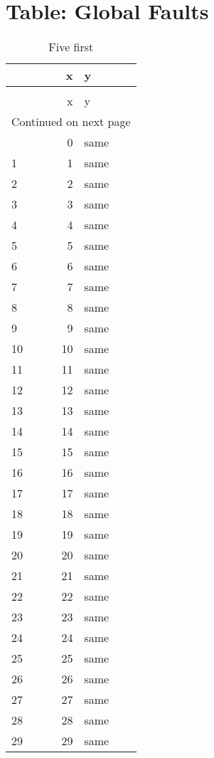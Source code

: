 \documentclass{article}%
\begin{document}
%
\normalsize%
\section{Table: Global Faults }%
\label{sec:TableGlobalFaults}%
\begin{longtable}{lrl}
\caption{Five first}\\
\toprule
{} &    x &     y \\
\midrule
\endfirsthead
\caption[]{Five first} \\
\toprule
{} &    x &     y \\
\midrule
\endhead
\midrule
\multicolumn{3}{r}{{Continued on next page}} \\
\midrule
\endfoot

\bottomrule
\endlastfoot
0   &    0 &  same \\
1   &    1 &  same \\
2   &    2 &  same \\
3   &    3 &  same \\
4   &    4 &  same \\
5   &    5 &  same \\
6   &    6 &  same \\
7   &    7 &  same \\
8   &    8 &  same \\
9   &    9 &  same \\
10  &   10 &  same \\
11  &   11 &  same \\
12  &   12 &  same \\
13  &   13 &  same \\
14  &   14 &  same \\
15  &   15 &  same \\
16  &   16 &  same \\
17  &   17 &  same \\
18  &   18 &  same \\
19  &   19 &  same \\
20  &   20 &  same \\
21  &   21 &  same \\
22  &   22 &  same \\
23  &   23 &  same \\
24  &   24 &  same \\
25  &   25 &  same \\
26  &   26 &  same \\
27  &   27 &  same \\
28  &   28 &  same \\
29  &   29 &  same \\

\end{longtable}
\end{document}

